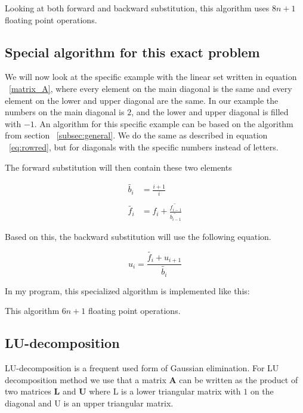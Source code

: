 \documentclass[a4paper,norsk,12pt,oneside]{article}
\begin{document}
 

Looking at both forward and backward substitution, this algorithm uses \(8n + 1\) floating point 
operations. 

\subsection{Special algorithm for this exact problem}

We will now look at the specific example with the linear set written in equation ~\ref{matrix_A}, 
where every element on the main diagonal is the same and every element on the lower and upper diagonal 
are the same. 
In our example the numbers on the main diagonal is \(2\), and the lower and upper diagonal
is filled with \(-1\). An algorithm for this specific example can be based on the algorithm 
from section ~\ref{subsec:general}. We do the same as described in equation ~\ref{eq:rowred}, but 
for diagonals with the specific numbers instead of letters. 

The forward substitution will then contain these two elements

\begin{align*}
    \tilde{b_i} &= \frac{i+1}{i}\\\\
    \tilde{f_i} &= f_i + \frac{\tilde{f_{i-1}}}{\tilde{b_{i-1}}}
\end{align*}

Based on this, the backward substitution will use the following equation. 

\begin{equation*}
    u_i = \frac{\tilde{f_i} + u_{i+1}}{\tilde{b_i}}
\end{equation*} 

In my program, this specialized algorithm is implemented like this:



This algorithm \(6n + 1\) floating point operations.  


\subsection{LU-decomposition}

LU-decomposition is a frequent used form of Gaussian elimination. 
For LU decomposition method we use that a matrix \(\textbf{A}\)
can be written as the product of two matrices \(\textbf{L}\) and \(\textbf{U}\) where
L is a lower triangular matrix with \(1\) on the diagonal and U is an upper triangular matrix.
\end{document}
